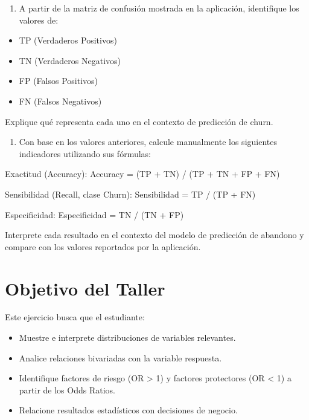 \documentclass[
]{article}
\providecommand{\tightlist}{%
  \setlength{\itemsep}{0pt}\setlength{\parskip}{0pt}}
\begin{document}
\begin{enumerate}
\def\labelenumi{\arabic{enumi}.}
\setcounter{enumi}{13}
\tightlist
\item
  A partir de la matriz de confusión mostrada en la aplicación,
  identifique los valores de:
\end{enumerate}

\begin{itemize}
\tightlist
\item
  TP (Verdaderos Positivos)\\
\item
  TN (Verdaderos Negativos)\\
\item
  FP (Falsos Positivos)\\
\item
  FN (Falsos Negativos)
\end{itemize}

Explique qué representa cada uno en el contexto de predicción de churn.

\begin{enumerate}
\def\labelenumi{\arabic{enumi}.}
\setcounter{enumi}{14}
\tightlist
\item
  Con base en los valores anteriores, calcule manualmente los siguientes
  indicadores utilizando sus fórmulas:
\end{enumerate}

Exactitud (Accuracy): Accuracy = (TP + TN) / (TP + TN + FP + FN)

Sensibilidad (Recall, clase Churn): Sensibilidad = TP / (TP + FN)

Especificidad: Especificidad = TN / (TN + FP)

Interprete cada resultado en el contexto del modelo de predicción de
abandono y compare con los valores reportados por la aplicación.

\section{Objetivo del Taller}\label{objetivo-del-taller}

Este ejercicio busca que el estudiante:

\begin{itemize}
\tightlist
\item
  Muestre e interprete distribuciones de variables relevantes.
\item
  Analice relaciones bivariadas con la variable respuesta.
\item
  Identifique factores de riesgo (OR \textgreater{} 1) y factores
  protectores (OR \textless{} 1) a partir de los Odds Ratios.
\item
  Relacione resultados estadísticos con decisiones de negocio.
\end{itemize}
\end{document}
